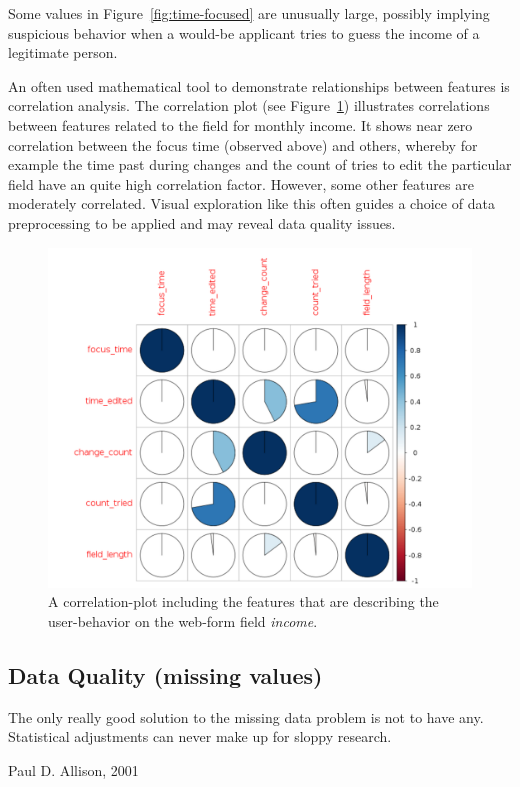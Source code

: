 Some values in Figure~\ref{fig:time-focused} are unusually large, possibly implying suspicious behavior when a would-be applicant tries to guess the income of a legitimate person.

An often used mathematical tool to demonstrate relationships between features is correlation analysis. The correlation plot (see Figure~\ref{fig:corr-plott}) illustrates correlations between features related to the field for monthly income.  It shows near zero correlation between the focus time (observed above) and others, whereby for example the time past during changes and the count of tries to edit the particular field have an quite high correlation factor. However, some other features are moderately correlated. Visual exploration like this often guides a choice of data preprocessing to be applied and may reveal data quality issues.

\begin{figure}[ht!]
    \centering
    \includegraphics[scale=0.4]{Graphics/corr-plott.png}
    \caption{A correlation-plot including the features that are describing the user-behavior on the web-form field \textit{income}.} %
    \label{fig:corr-plott}
\end{figure}


\subsection{Data Quality (missing values)}\label{Ch:2:DataQuality}
\epigraph{The only really good solution to the missing data problem is not to have any. Statistical adjustments can never make up for sloppy research. }{Paul D. Allison, 2001}


